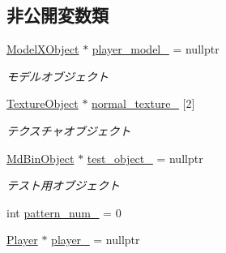 \subsection*{非公開変数類}
\begin{DoxyCompactItemize}
\item 
\mbox{\hyperlink{class_model_x_object}{Model\+X\+Object}} $\ast$ \mbox{\hyperlink{class_player_draw_a01943b6dec9856ef843f7afc0f8b4c02}{player\+\_\+model\+\_\+}} = nullptr
\begin{DoxyCompactList}\small\item\em モデルオブジェクト \end{DoxyCompactList}\item 
\mbox{\hyperlink{class_texture_object}{Texture\+Object}} $\ast$ \mbox{\hyperlink{class_player_draw_ac106fde46e38f5ac7f33de5cc5f6fd76}{normal\+\_\+texture\+\_\+}} \mbox{[}2\mbox{]}
\begin{DoxyCompactList}\small\item\em テクスチャオブジェクト \end{DoxyCompactList}\item 
\mbox{\hyperlink{class_md_bin_object}{Md\+Bin\+Object}} $\ast$ \mbox{\hyperlink{class_player_draw_a0f426ae7d3d5b8699acafe4a332f4d58}{test\+\_\+object\+\_\+}} = nullptr
\begin{DoxyCompactList}\small\item\em テスト用オブジェクト \end{DoxyCompactList}\item 
int \mbox{\hyperlink{class_player_draw_ae564ede28dfea0197d94f7f7dc61b5d1}{pattern\+\_\+num\+\_\+}} = 0
\item 
\mbox{\hyperlink{class_player}{Player}} $\ast$ \mbox{\hyperlink{class_player_draw_a40bb1d6e9b121df5178d3efc8d9cf03c}{player\+\_\+}} = nullptr
\end{DoxyCompactItemize}
